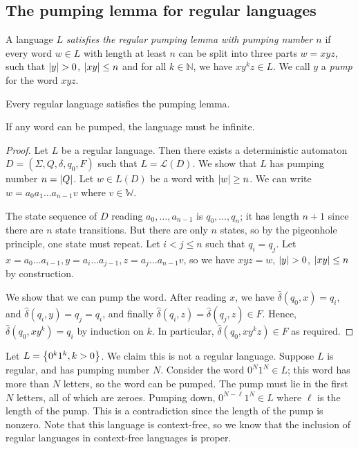 \subsection{The pumping lemma for regular languages}
\begin{definition}
	A language \( L \) \emph{satisfies the regular pumping lemma with pumping number \( n \)} if every word \( w \in L \) with length at least \( n \) can be split into three parts \( w = x y z \), such that \( \abs{y} > 0 \), \( \abs{xy} \leq n \) and for all \( k \in \mathbb N \), we have \( xy^kz \in L \).
	We call \( y \) a \emph{pump} for the word \( x y z \).
\end{definition}
\begin{theorem}
	Every regular language satisfies the pumping lemma.
\end{theorem}
\begin{remark}
	If any word can be pumped, the language must be infinite.
\end{remark}
\begin{proof}
	Let \( L \) be a regular language.
	Then there exists a deterministic automaton \( D = (\Sigma, Q, \delta, q_0, F) \) such that \( L = \mathcal L(D) \).
	We show that \( L \) has pumping number \( n = \abs{Q} \).
	Let \( w \in L(D) \) be a word with \( \abs{w} \geq n \).
	We can write \( w = a_0a_1 \dots a_{n-1} v \) where \( v \in \mathbb W \).

	The state sequence of \( D \) reading \( a_0, \dots, a_{n-1} \) is \( q_0, \dots, q_n \); it has length \( n + 1 \) since there are \( n \) state transitions.
	But there are only \( n \) states, so by the pigeonhole principle, one state must repeat.
	Let \( i < j \leq n \) such that \( q_i = q_j \).
	Let \( x = a_0 \dots a_{i-1}, y = a_i \dots a_{j-1}, z = a_j \dots a_{n-1} v \), so we have \( xyz = w \), \( \abs{y} > 0 \), \( \abs{xy} \leq n \) by construction.

	We show that we can pump the word.
	After reading \( x \), we have \( \hat\delta(q_0, x) = q_i \), and \( \hat\delta(q_i, y) = q_j = q_i \), and finally \( \hat\delta(q_i, z) = \hat\delta(q_j, z) \in F \).
	Hence, \( \hat\delta(q_0, xy^k) = q_i \) by induction on \( k \).
	In particular, \( \hat\delta(q_0, xy^kz) \in F \) as required.
\end{proof}
\begin{example}
	Let \( L = \qty{0^k 1^k, k > 0} \).
	We claim this is not a regular language.
	Suppose \( L \) is regular, and has pumping number \( N \).
	Consider the word \( 0^N 1^N \in L \); this word has more than \( N \) letters, so the word can be pumped.
	The pump must lie in the first \( N \) letters, all of which are zeroes.
	Pumping down, \( 0^{N-\ell} 1^N \in L \) where \( \ell \) is the length of the pump.
	This is a contradiction since the length of the pump is nonzero.
	Note that this language is context-free, so we know that the inclusion of regular languages in context-free languages is proper.
\end{example}
